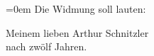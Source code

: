 \begin{ledgroupsized}[t]{13cm}
           \leftskip=0em{}\pstart
           \noindent{}{\pb}Die Widmung soll lauten:\pend
           \begin{mdbar}\pstart
           \noindent{}\centering{}Meinem lieben Arthur Schnitzler{\\}nach zwölf Jahren.\pend
           \end{mdbar}          \endnumbering{}\end{ledgroupsized}  \newcommand{\dateiname}{L01286}\newcommand{\titel}{Hermann Bahr an Arthur Schnitzler, 4. 4. [1903]}\newcommand{\editorInnen}{ Kurt Ifkovits,  Martin Anton Müller}
            \footnotesize
\begin{ledgroupsized}[t]{11.5cm}
\end{ledgroupsized}
         
      
